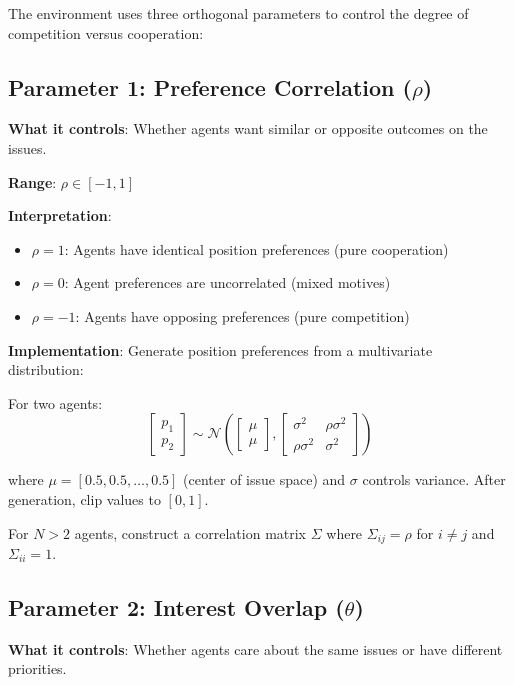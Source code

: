 \documentclass[11pt]{article}
\begin{document}
The environment uses three orthogonal parameters to control the degree of competition versus cooperation:

\subsection{Parameter 1: Preference Correlation ($\rho$)}

\textbf{What it controls}: Whether agents want similar or opposite outcomes on the issues.

\textbf{Range}: $\rho \in [-1, 1]$

\textbf{Interpretation}:
\begin{itemize}
    \item $\rho = 1$: Agents have identical position preferences (pure cooperation)
    \item $\rho = 0$: Agent preferences are uncorrelated (mixed motives)
    \item $\rho = -1$: Agents have opposing preferences (pure competition)
\end{itemize}

\textbf{Implementation}: Generate position preferences from a multivariate distribution:

For two agents:
\begin{equation}
\begin{bmatrix} p_1 \\ p_2 \end{bmatrix} \sim \mathcal{N}\left(\begin{bmatrix} \mu \\ \mu \end{bmatrix}, \begin{bmatrix} \sigma^2 & \rho\sigma^2 \\ \rho\sigma^2 & \sigma^2 \end{bmatrix}\right)
\end{equation}

where $\mu = [0.5, 0.5, \ldots, 0.5]$ (center of issue space) and $\sigma$ controls variance. After generation, clip values to $[0,1]$.

For $N > 2$ agents, construct a correlation matrix $\Sigma$ where $\Sigma_{ij} = \rho$ for $i \neq j$ and $\Sigma_{ii} = 1$.

\subsection{Parameter 2: Interest Overlap ($\theta$)}

\textbf{What it controls}: Whether agents care about the same issues or have different priorities.
\end{document}
